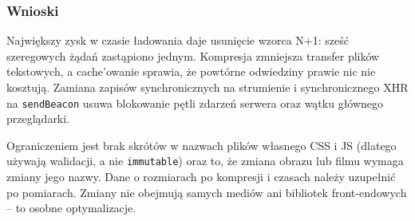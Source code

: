 \subsubsection{Wnioski}

Największy zysk w czasie ładowania daje usunięcie wzorca N+1: sześć szeregowych
żądań zastąpiono jednym. Kompresja zmniejsza transfer plików tekstowych, a
cache'owanie sprawia, że powtórne odwiedziny prawie nic nie kosztują. Zamiana
zapisów synchronicznych na strumienie i synchronicznego XHR na \texttt{sendBeacon}
usuwa blokowanie pętli zdarzeń serwera oraz wątku głównego przeglądarki.

Ograniczeniem jest brak skrótów w nazwach plików własnego CSS i JS (dlatego
używają walidacji, a nie \texttt{immutable}) oraz to, że zmiana obrazu lub filmu
wymaga zmiany jego nazwy. Dane o rozmiarach po kompresji i czasach należy uzupełnić
po pomiarach. Zmiany nie obejmują samych mediów ani bibliotek front-endowych --
to osobne optymalizacje.

